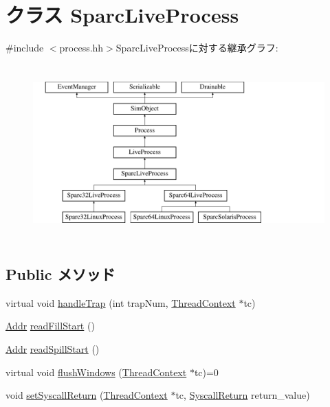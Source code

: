 \hypertarget{classSparcLiveProcess}{
\section{クラス SparcLiveProcess}
\label{classSparcLiveProcess}
}


{\ttfamily \#include $<$process.hh$>$}SparcLiveProcessに対する継承グラフ:\begin{figure}[H]
\begin{center}
\leavevmode
\includegraphics[height=6.80556cm]{classSparcLiveProcess}
\end{center}
\end{figure}
\subsection*{Public メソッド}
\begin{DoxyCompactItemize}
\item 
virtual void \hyperlink{classSparcLiveProcess_a7737d67ba76be0bd3beb0bd0dc93333a}{handleTrap} (int trapNum, \hyperlink{classThreadContext}{ThreadContext} $\ast$tc)
\item 
\hyperlink{base_2types_8hh_af1bb03d6a4ee096394a6749f0a169232}{Addr} \hyperlink{classSparcLiveProcess_a21c8d5b3f25a0b2b07e7d6339507f484}{readFillStart} ()
\item 
\hyperlink{base_2types_8hh_af1bb03d6a4ee096394a6749f0a169232}{Addr} \hyperlink{classSparcLiveProcess_ad091f71e79fb429f020a72b02b1b2b5a}{readSpillStart} ()
\item 
virtual void \hyperlink{classSparcLiveProcess_ab39e13308fa993d443b20e56572106f5}{flushWindows} (\hyperlink{classThreadContext}{ThreadContext} $\ast$tc)=0
\item 
void \hyperlink{classSparcLiveProcess_aaefd02663c1eae206b851290d9276a5e}{setSyscallReturn} (\hyperlink{classThreadContext}{ThreadContext} $\ast$tc, \hyperlink{classSyscallReturn}{SyscallReturn} return\_\-value)
\end{DoxyCompactItemize}
